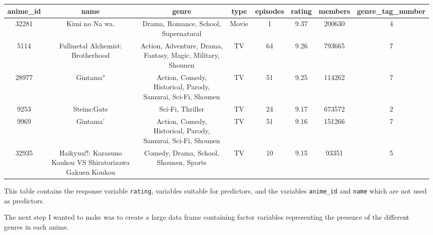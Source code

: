 \documentclass[
]{article}
\newenvironment{Shaded}{\begin{snugshade}}{\end{snugshade}}
\newcommand{\CommentTok}[1]{\textcolor[rgb]{0.56,0.35,0.01}{\textit{#1}}}
\newcommand{\ControlFlowTok}[1]{\textcolor[rgb]{0.13,0.29,0.53}{\textbf{#1}}}
\newcommand{\DataTypeTok}[1]{\textcolor[rgb]{0.13,0.29,0.53}{#1}}
\newcommand{\DecValTok}[1]{\textcolor[rgb]{0.00,0.00,0.81}{#1}}
\newcommand{\KeywordTok}[1]{\textcolor[rgb]{0.13,0.29,0.53}{\textbf{#1}}}
\newcommand{\NormalTok}[1]{#1}
\newcommand{\OperatorTok}[1]{\textcolor[rgb]{0.81,0.36,0.00}{\textbf{#1}}}
\newcommand{\StringTok}[1]{\textcolor[rgb]{0.31,0.60,0.02}{#1}}
\begin{document}
\begin{longtable}[]{@{}cccccccc@{}}
\toprule
anime\_id & name & genre & type & episodes & rating & members &
genre\_tag\_number\tabularnewline
\midrule
\endhead
32281 & Kimi no Na wa. & Drama, Romance, School, Supernatural & Movie &
1 & 9.37 & 200630 & 4\tabularnewline
5114 & Fullmetal Alchemist: Brotherhood & Action, Adventure, Drama,
Fantasy, Magic, Military, Shounen & TV & 64 & 9.26 & 793665 &
7\tabularnewline
28977 & Gintama° & Action, Comedy, Historical, Parody, Samurai, Sci-Fi,
Shounen & TV & 51 & 9.25 & 114262 & 7\tabularnewline
9253 & Steins;Gate & Sci-Fi, Thriller & TV & 24 & 9.17 & 673572 &
2\tabularnewline
9969 & Gintama' & Action, Comedy, Historical, Parody, Samurai, Sci-Fi,
Shounen & TV & 51 & 9.16 & 151266 & 7\tabularnewline
32935 & Haikyuu!!: Karasuno Koukou VS Shiratorizawa Gakuen Koukou &
Comedy, Drama, School, Shounen, Sports & TV & 10 & 9.15 & 93351 &
5\tabularnewline
\bottomrule
\end{longtable}

This table contains the response variable \texttt{rating}, variables
suitable for predictors, and the variables \texttt{anime\_id} and
\texttt{name} which are not used as predictors.

The next step I wanted to make was to create a large data frame
containing factor variables representing the presence of the different
genres in each anime.

\begin{Shaded}
\end{Shaded}
\end{document}
